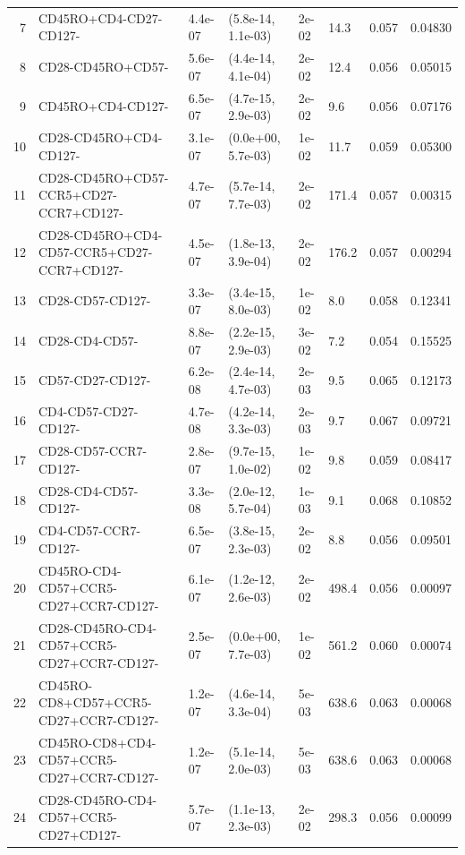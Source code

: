 \begin{landscape}
\begin{center}
{\begin{longtable}{rlllllll}
      7 & CD45RO+CD4-CD27-CD127- & 4.4e-07 & (5.8e-14, 1.1e-03) & 2e-02 &  14.3 & 0.057 & 0.04830 \\ 
      8 & CD28-CD45RO+CD57- & 5.6e-07 & (4.4e-14, 4.1e-04) & 2e-02 &  12.4 & 0.056 & 0.05015 \\ 
      9 & CD45RO+CD4-CD127- & 6.5e-07 & (4.7e-15, 2.9e-03) & 2e-02 &   9.6 & 0.056 & 0.07176 \\ 
      10 & CD28-CD45RO+CD4-CD127- & 3.1e-07 & (0.0e+00, 5.7e-03) & 1e-02 &  11.7 & 0.059 & 0.05300 \\ 
      11 & CD28-CD45RO+CD57-CCR5+CD27-CCR7+CD127- & 4.7e-07 & (5.7e-14, 7.7e-03) & 2e-02 & 171.4 & 0.057 & 0.00315 \\ 
      12 & CD28-CD45RO+CD4-CD57-CCR5+CD27-CCR7+CD127- & 4.5e-07 & (1.8e-13, 3.9e-04) & 2e-02 & 176.2 & 0.057 & 0.00294 \\ 
      13 & CD28-CD57-CD127- & 3.3e-07 & (3.4e-15, 8.0e-03) & 1e-02 &   8.0 & 0.058 & 0.12341 \\ 
      14 & CD28-CD4-CD57- & 8.8e-07 & (2.2e-15, 2.9e-03) & 3e-02 &   7.2 & 0.054 & 0.15525 \\ 
      15 & CD57-CD27-CD127- & 6.2e-08 & (2.4e-14, 4.7e-03) & 2e-03 &   9.5 & 0.065 & 0.12173 \\ 
      16 & CD4-CD57-CD27-CD127- & 4.7e-08 & (4.2e-14, 3.3e-03) & 2e-03 &   9.7 & 0.067 & 0.09721 \\ 
      17 & CD28-CD57-CCR7-CD127- & 2.8e-07 & (9.7e-15, 1.0e-02) & 1e-02 &   9.8 & 0.059 & 0.08417 \\ 
      18 & CD28-CD4-CD57-CD127- & 3.3e-08 & (2.0e-12, 5.7e-04) & 1e-03 &   9.1 & 0.068 & 0.10852 \\ 
      19 & CD4-CD57-CCR7-CD127- & 6.5e-07 & (3.8e-15, 2.3e-03) & 2e-02 &   8.8 & 0.056 & 0.09501 \\ 
      20 & CD45RO-CD4-CD57+CCR5-CD27+CCR7-CD127- & 6.1e-07 & (1.2e-12, 2.6e-03) & 2e-02 & 498.4 & 0.056 & 0.00097 \\ 
      21 & CD28-CD45RO-CD4-CD57+CCR5-CD27+CCR7-CD127- & 2.5e-07 & (0.0e+00, 7.7e-03) & 1e-02 & 561.2 & 0.060 & 0.00074 \\ 
      22 & CD45RO-CD8+CD57+CCR5-CD27+CCR7-CD127- & 1.2e-07 & (4.6e-14, 3.3e-04) & 5e-03 & 638.6 & 0.063 & 0.00068 \\ 
      23 & CD45RO-CD8+CD4-CD57+CCR5-CD27+CCR7-CD127- & 1.2e-07 & (5.1e-14, 2.0e-03) & 5e-03 & 638.6 & 0.063 & 0.00068 \\ 
      24 & CD28-CD45RO-CD4-CD57+CCR5-CD27+CD127- & 5.7e-07 & (1.1e-13, 2.3e-03) & 2e-02 & 298.3 & 0.056 & 0.00099 \\ 

\end{longtable}}
\end{center}
\end{landscape}
